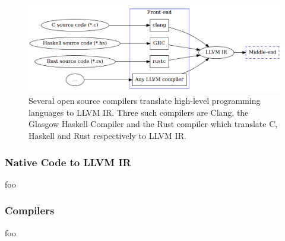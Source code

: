 \begin{figure}[htbp]
	\begin{center}
		\includegraphics[width=\textwidth]{inc/front-end_source.png}
		\caption{Several open source compilers translate high-level programming languages to LLVM IR. Three such compilers are Clang, the Glasgow Haskell Compiler and the Rust compiler which translate C, Haskell and Rust respectively to LLVM IR.}
		\label{fig:front-end_source}
	\end{center}
\end{figure}


\subsubsection{Native Code to LLVM IR}


foo


\subsubsection{Compilers}


foo




